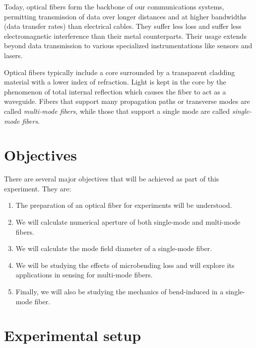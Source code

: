 \documentclass[%
 reprint,
nofootinbib,
 amsmath,amssymb,
 aps,
]{revtex4-2}
\begin{document}
Today, optical fibers form the backbone of our communications systems, permitting transmission of data over longer distances and at higher bandwidths (data transfer rates) than electrical cables. They suffer less loss and suffer less electromagnetic interference than their metal counterparts. Their usage extends beyond data transmission to various specialized instrumentations like sensors and lasers.

Optical fibers typically include a core surrounded by a transparent cladding material with a lower index of refraction. Light is kept in the core by the phenomenon of total internal reflection which causes the fiber to act as a waveguide. Fibers that support many propagation paths or transverse modes are called \textit{multi-mode fibers}, while those that support a single mode are called \textit{single-mode fibers}.



\section{Objectives}
There are several major objectives that will be achieved as part of this experiment. They are:
\begin{enumerate}
	\item The preparation of an optical fiber for experiments will be understood.
	\item We will calculate numerical aperture of both single-mode and multi-mode fibers.
	\item We will calculate the mode field diameter of a single-mode fiber.
	\item We will be studying the effects of microbending loss and will explore its applications in sensing for multi-mode fibers.
	\item Finally, we will also be studying the mechanics of bend-induced in a single-mode fiber.
\end{enumerate}

\section{Experimental setup}
\end{document}
